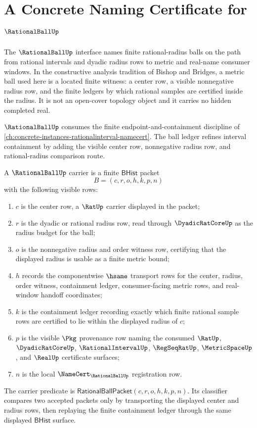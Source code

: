 \chapter{A Concrete Naming Certificate for $\RationalBallUp$}
\label{ch:concrete-instances-rational-ball-namecert}

The $\RationalBallUp$ interface names finite rational-radius balls on the
path from rational intervals and dyadic radius rows to metric and real-name
consumer windows. In the constructive analysis tradition of Bishop and
Bridges, a metric ball used here is a located finite witness: a center row,
a visible nonnegative radius row, and the finite ledgers by which rational
samples are certified inside the radius. It is not an open-cover topology
object and it carries no hidden completed real.

$\RationalBallUp$ consumes the finite endpoint-and-containment discipline of
\autoref{ch:concrete-instances-rationalinterval-namecert}. The ball ledger
refines interval containment by adding the visible center row, nonnegative
radius row, and rational-radius comparison route.

\begin{definition}
\label{def:rational-ball-bhist-carrier}
A $\RationalBallUp$ carrier is a finite $\mathsf{BHist}$ packet
$$
B=(c,r,o,h,k,p,n)
$$
with the following visible rows:
\begin{enumerate}
\item $c$ is the center row, a $\RatUp$ carrier displayed in the packet;
\item $r$ is the dyadic or rational radius row, read through
  $\DyadicRatCoreUp$ as the radius budget for the ball;
\item $o$ is the nonnegative radius and order witness row, certifying that
  the displayed radius is usable as a finite metric bound;
\item $h$ records the componentwise $\hsame$ transport rows for the center,
  radius, order witness, containment ledger, consumer-facing metric rows, and
  real-window handoff coordinates;
\item $k$ is the containment ledger recording exactly which finite rational
  sample rows are certified to lie within the displayed radius of $c$;
\item $p$ is the visible $\Pkg$ provenance row naming the consumed
  $\RatUp$, $\DyadicRatCoreUp$, $\RationalIntervalUp$, $\RegSeqRatUp$,
  $\MetricSpaceUp$, and $\RealUp$ certificate surfaces;
\item $n$ is the local $\NameCert_{\RationalBallUp}$ registration row.
\end{enumerate}
The carrier predicate is
$\mathsf{RationalBallPacket}(c,r,o,h,k,p,n)$. Its classifier compares two
accepted packets only by transporting the displayed center and radius rows,
then replaying the finite containment ledger through the same displayed
$\mathsf{BHist}$ surface.
\end{definition}

